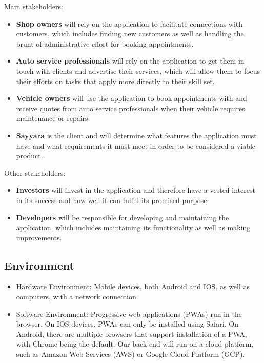 \documentclass{article}
\begin{document}
Main stakeholders:

\begin{itemize}
    \item \textbf{Shop owners} will rely on the application to facilitate connections with customers, which includes finding new customers as well as handling the brunt of administrative effort for booking appointments.
    \item \textbf{Auto service professionals} will rely on the application to get them in touch with clients and advertise their services, which will allow them to focus their efforts on tasks that apply more directly to their skill set.
    \item \textbf{Vehicle owners} will use the application to book appointments with and receive quotes from auto service professionals when their vehicle requires maintenance or repairs.
    \item \textbf{Sayyara} is the client and will determine what features the application must have and what requirements it must meet in order to be considered a viable product.
\end{itemize}

\noindent Other stakeholders:
\begin{itemize}
    \item \textbf{Investors} will invest in the application and therefore have a vested interest in its success and how well it can fulfill its promised purpose.
    \item \textbf{Developers} will be responsible for developing and maintaining the application, which includes maintaining its functionality as well as making improvements.
\end{itemize}
\subsection{Environment}

\begin{itemize}
    \item Hardware Environment: Mobile devices, both Android and IOS, as well as computers, with a network connection.
    \item Software Environment: Progressive web applications (PWAs) run in the browser. On IOS devices, PWAs can only be installed using Safari. On Android, there are multiple browsers that support installation of a PWA, with Chrome being the default. Our back end will run on a cloud platform, such as Amazon Web Services (AWS) or Google Cloud Platform (GCP).
\end{itemize}
\end{document}
